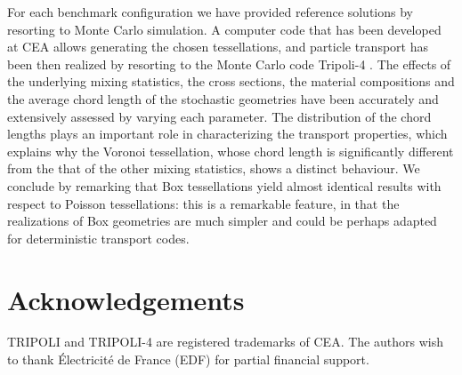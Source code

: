 \documentclass[final,authoryear,5p,times,twocolumn]{elsarticle}
\newcommand{\tripoli}{{\sc Tripoli-4}\textsuperscript{ \textregistered}}
\begin{document}
For each benchmark configuration we have provided reference solutions by resorting to Monte Carlo simulation. A computer code that has been developed at CEA allows generating the chosen tessellations, and particle transport has been then realized by resorting to the Monte Carlo code \tripoli{}. The effects of the underlying mixing statistics, the cross sections, the material compositions and the average chord length of the stochastic geometries have been accurately and extensively assessed by varying each parameter. The distribution of the chord lengths plays an important role in characterizing the transport properties, which explains why the Voronoi tessellation, whose chord length is significantly different from the that of the other mixing statistics, shows a distinct behaviour. We conclude by remarking that Box tessellations yield almost identical results with respect to Poisson tessellations: this is a remarkable feature, in that the realizations of Box geometries are much simpler and could be perhaps adapted for deterministic transport codes.

\section*{Acknowledgements}
TRIPOLI\textsuperscript{ \textregistered} and TRIPOLI-4\textsuperscript{ \textregistered} are registered trademarks of CEA. The authors wish to thank \'Electricit\'e de France (EDF) for partial financial support.
\end{document}
